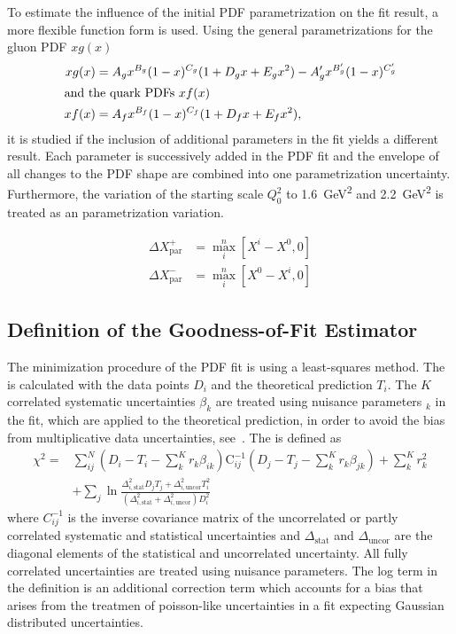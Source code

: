 To estimate the influence of the initial PDF parametrization on the fit result, a
more flexible function form is used. Using the general
parametrizations for the gluon PDF $xg(x)$
%
\begin{align*}
   xg(x) &= A_g x^{B_g} (1-x)^{C_g} (1  + D_g x + E_g x^2) - A'_g x^{B'_g} (1-x)^{C'_g}\\
\intertext{and the quark PDFs $xf(x)$}
   xf(x) &= A_{f}  x^{B_{f}} (1-x)^{C_{f}} (1 + D_{f}x + E_{f}x^2),
\end{align*}
%
it is studied if the inclusion of additional parameters in the fit yields
a different result. Each parameter is successively added in the PDF fit and the
envelope of all changes to the PDF shape are combined into one parametrization
uncertainty. Furthermore, the variation of the starting scale $Q_0^2$ to
\SI{1.6}{\GeV\squared} and \SI{2.2}{\GeV\squared} is treated as an 
parametrization variation.

\begin{align*}
  \Delta X^+_{\mathrm{par}} &= \max_{i}^{n} \left[ X^i - X^0, 0 \right]\\
  \Delta X^-_{\mathrm{par}} &= \max_{i}^{n} \left[ X^0 - X^i, 0 \right]
\end{align*}


\subsection{Definition of the Goodness-of-Fit Estimator}
\label{sec:chi2_definition}

The minimization procedure of the PDF fit is using a least-squares method. The \chisq is
calculated with the data points $D_i$ and the theoretical prediction $T_i$. The
$K$  correlated systematic uncertainties $\beta_{k}$ are treated using nuisance parameters
$_k$ in the fit, which are applied to the theoretical prediction, in order to avoid the bias from
multiplicative data uncertainties, see~\cite{Lyons:1989gh}. The \chisq is
defined as
%
\begin{align*}
  \chi^2 = &\sum_{ij}^N \left(D_i - T_i - \sum_k^K r_k \beta_{ik}\right) \mathrm{C}_{ij}^{-1}
  \left(D_j - T_j - \sum_k^K r_k \beta_{jk} \right) + \sum_k^K r_k^2\\
  &+ \sum_j \ln \frac{\Delta_{i,\mathrm{stat}}^2 D_j T_j + \Delta_{i,\mathrm{uncor}}^2 T_i^2}{\left( \Delta_{i,\mathrm{stat}}^2 + \Delta_{i,\mathrm{uncor}}^2 \right) D_i^2}
  \label{chi2_nuisance}
\end{align*}
%
where $C_{ij}^{-1}$ is the inverse covariance matrix of the uncorrelated or
partly correlated systematic and statistical uncertainties and $\Delta_\mathrm{stat}$ and
$\Delta_\mathrm{uncor}$ are the diagonal elements of the statistical and
uncorrelated uncertainty. All fully correlated uncertainties are treated using
nuisance parameters. The log term in the \chisq definition is an additional
correction term which accounts for a bias that arises from the treatmen of
poisson-like uncertainties in a \chisq fit expecting Gaussian distributed
uncertainties.


